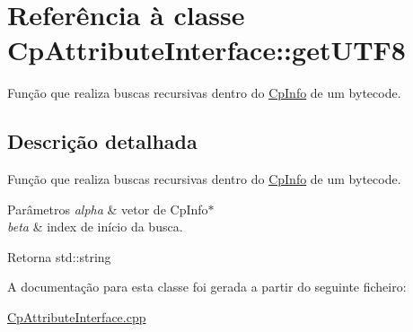 \hypertarget{class_cp_attribute_interface_1_1get_u_t_f8}{}\section{Referência à classe Cp\+Attribute\+Interface\+:\+:get\+U\+T\+F8}
\label{class_cp_attribute_interface_1_1get_u_t_f8}


Função que realiza buscas recursivas dentro do \hyperlink{class_cp_info}{Cp\+Info} de um bytecode.  




\subsection{Descrição detalhada}
Função que realiza buscas recursivas dentro do \hyperlink{class_cp_info}{Cp\+Info} de um bytecode. 


\begin{DoxyParams}{Parâmetros}
{\em alpha} & vetor de Cp\+Info$\ast$ \\
\hline
{\em beta} & index de início da busca. \\
\hline
\end{DoxyParams}
\begin{DoxyReturn}{Retorna}
std\+::string 
\end{DoxyReturn}


A documentação para esta classe foi gerada a partir do seguinte ficheiro\+:\begin{DoxyCompactItemize}
\item 
\hyperlink{_cp_attribute_interface_8cpp}{Cp\+Attribute\+Interface.\+cpp}\end{DoxyCompactItemize}
